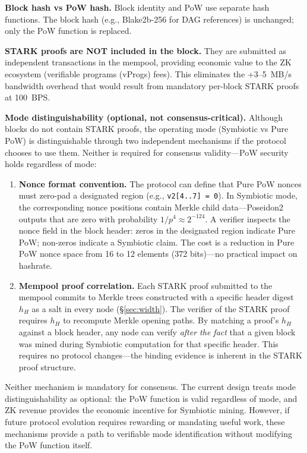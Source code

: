 \documentclass[11pt,a4paper]{article}
\begin{document}
\textbf{Block hash vs PoW hash.} Block identity and PoW use separate hash functions. The block hash (e.g., Blake2b-256 for DAG references) is unchanged; only the PoW function is replaced.

\textbf{STARK proofs are NOT included in the block.} They are submitted as independent transactions in the mempool, providing economic value to the ZK ecosystem (verifiable programs (vProgs) fees). This eliminates the +3--5~MB/s bandwidth overhead that would result from mandatory per-block STARK proofs at 100~BPS.

\textbf{Mode distinguishability (optional, not consensus-critical).} Although blocks do not contain STARK proofs, the operating mode (Symbiotic vs Pure PoW) is distinguishable through two independent mechanisms if the protocol chooses to use them. Neither is required for consensus validity---PoW security holds regardless of mode:

\begin{enumerate}
\item \textbf{Nonce format convention.} The protocol can define that Pure PoW nonces must zero-pad a designated region (e.g., \texttt{v2[4..7] = 0}). In Symbiotic mode, the corresponding nonce positions contain Merkle child data---Poseidon2 outputs that are zero with probability $1/p^4 \approx 2^{-124}$. A verifier inspects the nonce field in the block header: zeros in the designated region indicate Pure PoW; non-zeros indicate a Symbiotic claim. The cost is a reduction in Pure PoW nonce space from 16 to 12 elements (372 bits)---no practical impact on hashrate.

\item \textbf{Mempool proof correlation.} Each STARK proof submitted to the mempool commits to Merkle trees constructed with a specific header digest $h_H$ as a salt in every node (\S\ref{sec:width}). The verifier of the STARK proof requires $h_H$ to recompute Merkle opening paths. By matching a proof's $h_H$ against a block header, any node can verify \emph{after the fact} that a given block was mined during Symbiotic computation for that specific header. This requires no protocol changes---the binding evidence is inherent in the STARK proof structure.
\end{enumerate}

Neither mechanism is mandatory for consensus. The current design treats mode distinguishability as optional: the PoW function is valid regardless of mode, and ZK revenue provides the economic incentive for Symbiotic mining. However, if future protocol evolution requires rewarding or mandating useful work, these mechanisms provide a path to verifiable mode identification without modifying the PoW function itself.
\end{document}
